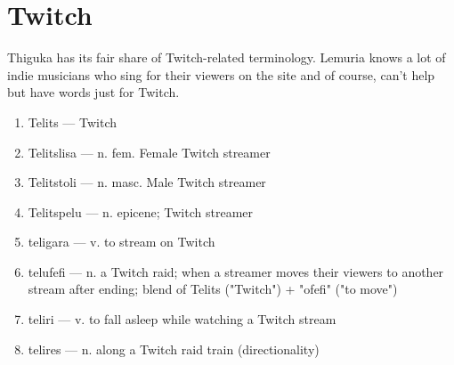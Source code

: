 \section{Twitch}
Thiguka has its fair share of Twitch-related terminology.
Lemuria knows a lot of indie musicians who sing for their viewers on the site and of course, can't help but have words just for Twitch.

\begin{multicols}{2} 
    \begin{enumerate}
        \item Telits --- Twitch
        \item Telitslisa --- n. fem. Female Twitch streamer
        \item Telitstoli --- n. masc. Male Twitch streamer
        \item Telitspelu --- n. epicene; Twitch streamer
        \item teligara --- v. to stream on Twitch
        \item telufefi --- n. a Twitch raid; when a streamer moves their viewers to another stream after ending; blend of Telits ("Twitch") + "ofefi" ("to move")
        \item teliri --- v. to fall asleep while watching a Twitch stream
        \item telires --- n. along a Twitch raid train (directionality)
    \end{enumerate}
\end{multicols}
